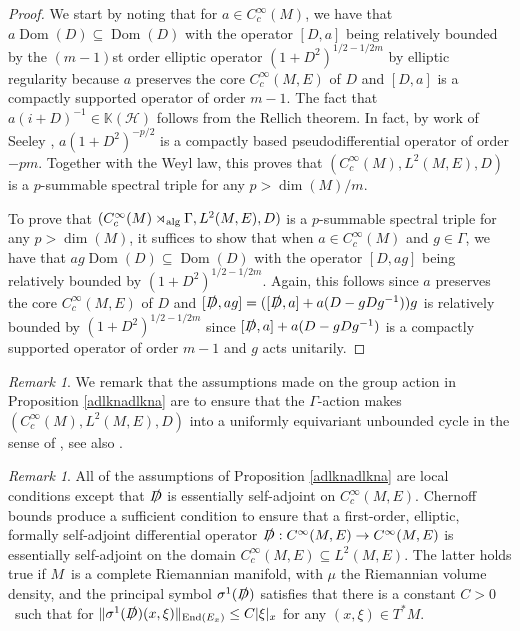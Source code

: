 \documentclass[a4paper,reqno]{amsart}
\numberwithin{equation}{section}
\def\End{\operatorname{End}}
\def\Dom{\operatorname{Dom}}
\def\dim{\operatorname{dim}}
\theoremstyle{definition}
\theoremstyle{remark}
\newtheorem{remark}[thm]{Remark}
\begin{document}
\begin{proof}
We start by noting that for $a\in C^\infty_c(M)$, we have that $a\Dom(D)\subseteq \Dom(D)$ with the operator $[D,a]$ being relatively bounded by the $(m-1)$st order elliptic operator $(1+D^2)^{1/2-1/2m}$ by elliptic regularity because $a$ preserves the core $C^\infty_c(M,E)$ of $D$ and $[D,a]$ is a compactly supported operator of order $m-1$. The fact that $a(i+D)^{-1}\in \mathbb{K}(\mathcal{H})$ follows from the Rellich theorem. In fact, by work of Seeley \cite{Seeley1967}, $a(1+D^2)^{-p/2}$ is a compactly based pseudodifferential operator of order $-pm$. Together with the Weyl law, this proves that $(C^\infty_c(M),L^2(M,E),D)$ is a $p$-summable spectral triple for any $p>\dim(M)/m$. 


To prove that $(C^\infty_c(M)\rtimes_{\rm alg}\Gamma,L^2(M,E),D)$ is a $p$-summable spectral triple for any $p>\dim(M)$, it suffices to show that when $a\in C^\infty_c(M)$ and $g\in \Gamma$, we have that $ag\Dom(D)\subseteq \Dom(D)$ with the operator $[D,ag]$ being relatively bounded by $(1+D^2)^{1/2-1/2m}$. Again, this follows since $a$ preserves the core $C^\infty_c(M,E)$ of $D$ and $[\slashed{D},ag]=([\slashed{D},a]+a(D-gDg^{-1}))g$ is relatively bounded by $(1+D^2)^{1/2-1/2m}$ since $[\slashed{D},a]+a(D-gDg^{-1})$ is a compactly supported operator of order $m-1$ and $g$ acts unitarily.
\end{proof}


\begin{remark}
We remark that the assumptions made on the group action in Proposition \ref{adlknadlkna} are to ensure that the $\Gamma$-action makes $(C^\infty_c(M),L^2(M,E),D)$ into a uniformly equivariant unbounded cycle in the sense of \cite[Definition I.2.7]{adathesis}, see also \cite[Definition 8.7]{danthesis}.
\end{remark}


\begin{remark}
\label{chernoffrem}
All of the assumptions of Proposition \ref{adlknadlkna} are local conditions except that $\slashed{D}$ is essentially self-adjoint on $C^\infty_c(M,E)$. Chernoff bounds \cite{chernoffjfa} produce a sufficient condition to ensure that a first-order, elliptic, formally self-adjoint differential operator $\slashed{D}:C^\infty(M,E)\to C^\infty(M,E)$ is essentially self-adjoint on the domain $C^\infty_c(M,E)\subseteq L^2(M,E)$. The latter holds true if $M$ is a complete Riemannian manifold, with $\mu$ the Riemannian volume density, and the principal symbol $\sigma^1(\slashed{D})$ satisfies that there is a constant $C>0$ such that for $\|\sigma^1(\slashed{D})(x,\xi)\|_{\End(E_x)}\leq C|\xi|_x$ for any $(x,\xi)\in T^*M$.
\end{remark}
\end{document}
